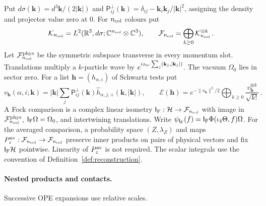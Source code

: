 \begin{definition}\label{def:fock-comparisons}
Put $d\sigma(\mathbf k)=d^3\mathbf k/(2|\mathbf k|)$ and $\mathsf P^\perp_{ij}(\mathbf k)=\delta_{ij}-\mathbf k_i\mathbf k_j/|\mathbf k|^2$, assigning the density and projector value zero at $0$. For $n_{\rm col}$ colours put
\begin{equation}\label{eq:fock-space}
\mathcal K_{n_{\rm col}}=L^2(\mathbb{R}^3,d\sigma;\mathbb{C}^{n_{\rm col}}\otimes\mathbb{C}^3),\qquad \mathcal F_{n_{\rm col}}=\bigoplus_{k\ge0}\mathcal K_{n_{\rm col}}^{\otimes k}\,.
\end{equation}
Let $\mathcal F_{n_{\rm col}}^{\rm phys}$ be the symmetric subspace transverse in every momentum slot. Translations multiply a $k$-particle wave by $e^{iz_{\rm tr}\cdot\sum_j(\mathbf k_j,|\mathbf k_j|)}$. The vacuum $\Omega_0$ lies in sector zero. For a list $\boldsymbol h=(h_{\alpha,i})$ of Schwartz tests put
\begin{equation}\label{eq:coherent-vector}
v_{\boldsymbol h}(\alpha,i;\mathbf k)=|\mathbf k|\sum_j\mathsf P^\perp_{ij}(\mathbf k)\widehat{h}_{\alpha,j,+}(\mathbf k,|\mathbf k|),\qquad \mathcal E(\boldsymbol h)=e^{-\|v_{\boldsymbol h}\|^2/2}\bigoplus_{k\ge0}\frac{v_{\boldsymbol h}^{\otimes k}}{\sqrt{k!}}\,.
\end{equation}
A Fock comparison is a complex linear isometry $\mathsf I_{\rm F}:\mathcal H\to\mathcal F_{n_{\rm col}}$ with image in $\mathcal F_{n_{\rm col}}^{\rm phys}$, $\mathsf I_{\rm F}\Omega=\Omega_0$, and intertwining translations. Write $\psi_{\mathsf I_{\rm F}}(f)=\mathsf I_{\rm F}\Phi(\iota_4\Theta,f)\Omega$. For the averaged comparison, a probability space $(Z,\lambda_Z)$ and maps $P_z^{\rm av}:\mathcal F_{n_{\rm col}}\to\mathcal F_{n_{\rm col}}$ preserve inner products on pairs of physical vectors and fix $\mathsf I_{\rm F}\mathcal H$ pointwise. Linearity of $P_z^{\rm av}$ is not required. The scalar integrals use the convention of Definition~\ref{def:reconstruction}.
\end{definition}

\paragraph{Nested products and contacts.} Successive OPE expansions use relative scales.

